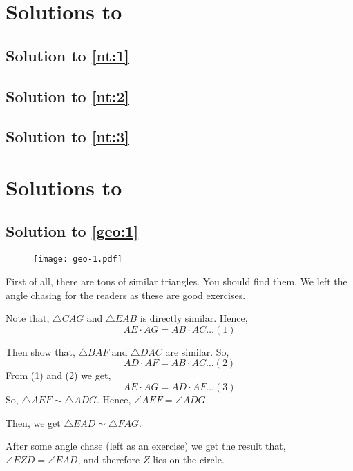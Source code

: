 \section{Solutions to }


\subsection*{Solution to \autoref{nt:1}}

\subsection*{Solution to \autoref{nt:2}}


\subsection*{Solution to \autoref{nt:3}}







\section{Solutions to }

\subsection*{Solution to \autoref{geo:1}}

\begin{figure}[ht]
\centering
	\texttt{[image: geo-1.pdf]}
\end{figure}
First of all, there are tons of similar triangles. You should find them. We left the angle chasing for the readers as these are good  exercises. 

Note that, $\triangle CAG$ and $\triangle EAB$ is directly similar. Hence, 
\[ AE \cdot AG = AB \cdot AC \ldots (1) \]

Then show that, $\triangle BAF$ and $\triangle DAC$ are similar. So, 
\[ AD \cdot AF = AB \cdot AC \ldots (2)  \]
From (1) and (2) we get, 
\[  AE \cdot AG = AD \cdot AF \ldots (3) \]
So, $\triangle AEF \sim \triangle ADG$. 
Hence, $\angle AEF = \angle ADG.$

Then, we get $\triangle EAD \sim \triangle FAG.$ 

After some angle chase (left as an exercise) we  get the result that, $\angle EZD = \angle EAD$, and therefore $Z$ lies on the  circle.


